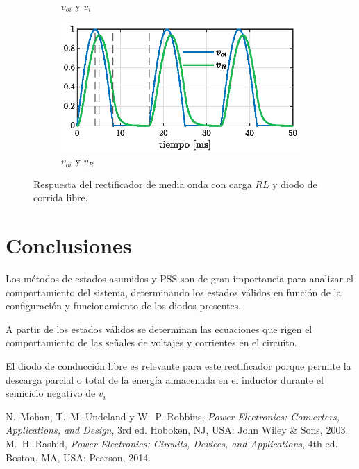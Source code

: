 \documentclass[conference]{IEEEtran}
\begin{document}
\begin{figure}[ht]
\begin{subfigure}[t]{0.5\textwidth}
    \caption{$v_{oi}$ y $v_i$}
    \label{fig:voi-vi}
  \end{subfigure}\hfill
  \begin{subfigure}[t]{0.5\textwidth}
    \centering
    \includegraphics[width=\linewidth]{figuras/voi_vr.eps}
    \caption{$v_{oi}$ y $v_R$}
    \label{fig:voi-vr}
  \end{subfigure}
  \caption{Respuesta del rectificador de media onda con carga $RL$ y diodo de corrida libre.}
  \label{fig:rectificador-subfigs}
\end{figure}

\section{Conclusiones}
Los métodos de estados asumidos y PSS son de gran importancia para analizar el comportamiento del sistema, determinando los estados válidos en función de la configuración y funcionamiento de los diodos presentes.

A partir de los estados válidos se determinan las ecuaciones que rigen el comportamiento de las señales de voltajes y corrientes en el circuito. 

El diodo de conducción libre es relevante para este rectificador porque permite la descarga parcial o total de la energía almacenada en el inductor durante el semiciclo negativo de $v_i$




\begin{thebibliography}{plain}
N.~Mohan, T.~M. Undeland y W.~P. Robbins,
\textit{Power Electronics: Converters, Applications, and Design},
3rd ed. Hoboken, NJ, USA: John Wiley \& Sons, 2003.
M.~H. Rashid, \textit{Power Electronics: Circuits, Devices, and Applications},
4th ed. Boston, MA, USA: Pearson, 2014.

\end{thebibliography}
\end{document}

